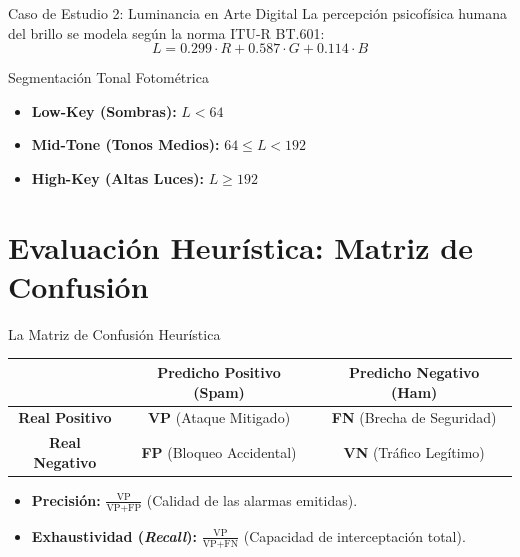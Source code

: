 \documentclass[aspectratio=169]{beamer}
\begin{document}
\begin{frame}{Caso de Estudio 2: Luminancia en Arte Digital}
    La percepción psicofísica humana del brillo se modela según la norma ITU-R BT.601:
    \begin{equation*}
        L = 0.299 \cdot R + 0.587 \cdot G + 0.114 \cdot B
    \end{equation*}
    \begin{block}{Segmentación Tonal Fotométrica}
        \begin{itemize}
            \item \textbf{Low-Key (Sombras):} $L < 64$
            \item \textbf{Mid-Tone (Tonos Medios):} $64 \le L < 192$
            \item \textbf{High-Key (Altas Luces):} $L \ge 192$
        \end{itemize}
    \end{block}
\end{frame}

\section{Evaluación Heurística: Matriz de Confusión}

\begin{frame}{La Matriz de Confusión Heurística}
    \begin{center}
    \begin{tabular}{c|cc}
        \toprule
        & \textbf{Predicho Positivo (Spam)} & \textbf{Predicho Negativo (Ham)} \\
        \midrule
        \textbf{Real Positivo} & \textbf{VP} (Ataque Mitigado) & \textbf{FN} (Brecha de Seguridad) \\
        \textbf{Real Negativo} & \textbf{FP} (Bloqueo Accidental) & \textbf{VN} (Tráfico Legítimo) \\
        \bottomrule
    \end{tabular}
    \end{center}
    \vspace{0.4cm}
    \begin{itemize}
        \item \textbf{Precisión:} $\frac{\text{VP}}{\text{VP} + \text{FP}}$ (Calidad de las alarmas emitidas).
        \item \textbf{Exhaustividad (\textit{Recall}):} $\frac{\text{VP}}{\text{VP} + \text{FN}}$ (Capacidad de interceptación total).
    \end{itemize}
\end{frame}
\end{document}
